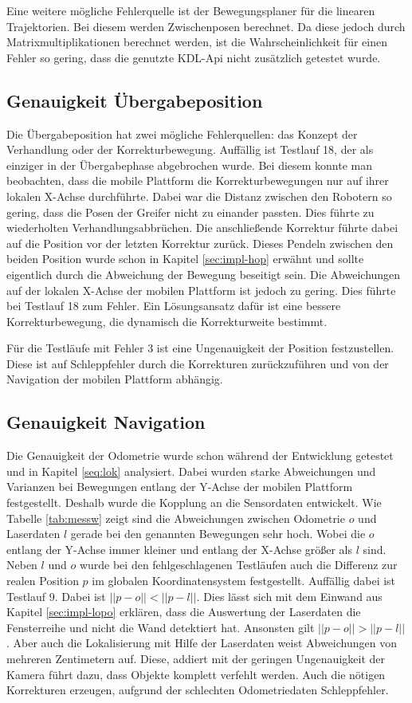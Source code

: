 Eine weitere mögliche Fehlerquelle ist der Bewegungsplaner für die linearen Trajektorien. Bei diesem werden Zwischenposen berechnet. Da diese jedoch durch Matrixmultiplikationen berechnet werden, ist die Wahrscheinlichkeit für einen Fehler so gering, dass die genutzte KDL-Api nicht zusätzlich getestet wurde.
 
\subsection{Genauigkeit Übergabeposition}
Die Übergabeposition hat zwei mögliche Fehlerquellen: das Konzept der Verhandlung oder der Korrekturbewegung. Auffällig ist Testlauf 18, der als einziger in der Übergabephase abgebrochen wurde. Bei diesem konnte man beobachten, dass die mobile Plattform die Korrekturbewegungen nur auf ihrer lokalen X-Achse durchführte. Dabei war die Distanz zwischen den Robotern so gering, dass die Posen der Greifer nicht zu einander passten. Dies führte zu wiederholten Verhandlungsabbrüchen. Die anschließende Korrektur führte dabei auf die Position vor der letzten Korrektur zurück. Dieses Pendeln zwischen den beiden Position wurde schon in Kapitel \ref{sec:impl-hop} erwähnt und sollte eigentlich durch die Abweichung der Bewegung beseitigt sein. Die Abweichungen auf der lokalen X-Achse der mobilen Plattform ist jedoch zu gering. Dies führte bei Testlauf 18 zum Fehler. Ein Lösungsansatz dafür ist eine bessere Korrekturbewegung, die dynamisch die Korrekturweite bestimmt.

Für die Testläufe mit Fehler 3 ist eine Ungenauigkeit der Position festzustellen. Diese ist auf Schleppfehler durch die Korrekturen zurückzuführen und von der Navigation der mobilen Plattform abhängig.

\subsection{Genauigkeit Navigation}
Die Genauigkeit der Odometrie wurde schon während der Entwicklung getestet und in Kapitel \ref{seq:lok} analysiert. Dabei wurden starke Abweichungen und Varianzen bei Bewegungen entlang der Y-Achse der mobilen Plattform festgestellt. Deshalb wurde die Kopplung an die Sensordaten entwickelt. Wie Tabelle \ref{tab:messw} zeigt sind die Abweichungen zwischen Odometrie $o$ und Laserdaten $l$ gerade bei den genannten Bewegungen sehr hoch. Wobei die $o$ entlang der Y-Achse immer kleiner und entlang der X-Achse größer als $l$ sind. Neben $l$ und $o$ wurde bei den fehlgeschlagenen Testläufen auch die Differenz zur realen Position $p$ im globalen Koordinatensystem festgestellt. Auffällig dabei ist Testlauf 9. Dabei ist $||p-o||<||p-l||$. Dies lässt sich mit dem Einwand aus Kapitel \ref{sec:impl-lopo} erklären, dass die Auswertung der Laserdaten die Fensterreihe und nicht die Wand detektiert hat. Ansonsten gilt $||p-o||>||p-l||$.  Aber auch die Lokalisierung mit Hilfe der Laserdaten weist Abweichungen von mehreren Zentimetern auf. Diese, addiert mit der geringen Ungenauigkeit der Kamera führt dazu, dass Objekte komplett verfehlt werden. Auch die nötigen Korrekturen erzeugen, aufgrund der schlechten Odometriedaten Schleppfehler.

